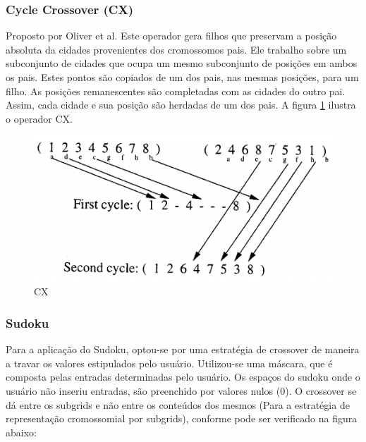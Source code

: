 \documentclass[twoside]{article}
\begin{document}
\begin{multicols}{2}
\subsubsection{Cycle Crossover (CX)}
Proposto por Oliver et al. Este operador gera filhos que preservam a posição absoluta da cidades provenientes dos cromossomos pais. Ele trabalho sobre um subconjunto de cidades que ocupa um mesmo subconjunto de posições em ambos os pais. Estes pontos são copiados de um dos pais, nas mesmas posições, para um filho. As posições remanescentes são completadas com as cidades do outro pai. Assim, cada cidade e sua posição são herdadas de um dos pais. A figura \ref{fig:cx} ilustra o operador CX.
\begin{figure}[H]
\label{fig:cx}
  \caption{CX}
  \centering
    \includegraphics[scale = 0.55]{crossover_cx.png}
\end{figure}

\subsubsection{Sudoku}
Para a aplicação do Sudoku, optou-se por uma estratégia de crossover de maneira a travar os valores estipulados pelo usuário. Utilizou-se uma máscara, que é composta pelas entradas determinadas pelo usuário. Os espaços do sudoku onde o usuário não inseriu entradas, são preenchido por valores nulos (0). O crossover se dá entre os subgrids e não entre os conteúdos dos mesmos (Para a estratégia de representação cromossomial por subgrids), conforme pode ser verificado na figura abaixo:


\end{multicols}
\end{document}
